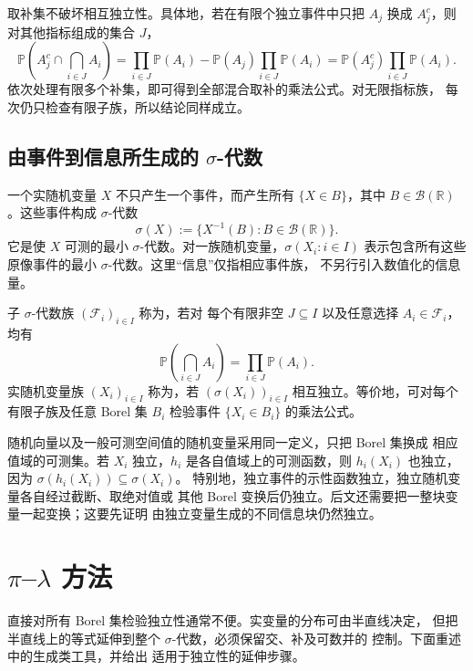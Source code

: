 取补集不破坏相互独立性。具体地，若在有限个独立事件中只把 $A_j$ 换成
$A_j^c$，则对其他指标组成的集合 $J$，
\[
 \mathbb P\left(A_j^c\cap\bigcap_{i\in J}A_i\right)
 =\prod_{i\in J}\mathbb P(A_i)
  -\mathbb P(A_j)\prod_{i\in J}\mathbb P(A_i)
 =\mathbb P(A_j^c)\prod_{i\in J}\mathbb P(A_i).
\]
依次处理有限多个补集，即可得到全部混合取补的乘法公式。对无限指标族，
每次仍只检查有限子族，所以结论同样成立。

\subsection{由事件到信息所生成的 $\sigma$-代数}

一个实随机变量 $X$ 不只产生一个事件，而产生所有 $\{X\in B\}$，其中
$B\in\mathcal B(\mathbb R)$。这些事件构成 $\sigma$-代数
\[
 \sigma(X):=\{X^{-1}(B):B\in\mathcal B(\mathbb R)\}.
\]
它是使 $X$ 可测的最小 $\sigma$-代数。对一族随机变量，$\sigma(X_i:i\in I)$
表示包含所有这些原像事件的最小 $\sigma$-代数。这里“信息”仅指相应事件族，
不另行引入数值化的信息量。

\begin{definition}
\label{def:independent-sigma-fields}
子 $\sigma$-代数族 $(\mathcal F_i)_{i\in I}$ 称为，若对
每个有限非空 $J\subseteq I$ 以及任意选择 $A_i\in\mathcal F_i$，均有
\[
 \mathbb P\left(\bigcap_{i\in J}A_i\right)
 =\prod_{i\in J}\mathbb P(A_i).
\]
实随机变量族 $(X_i)_{i\in I}$ 称为，若
$(\sigma(X_i))_{i\in I}$ 相互独立。等价地，可对每个有限子族及任意
Borel 集 $B_i$ 检验事件 $\{X_i\in B_i\}$ 的乘法公式。
\end{definition}

随机向量以及一般可测空间值的随机变量采用同一定义，只把 Borel 集换成
相应值域的可测集。若 $X_i$ 独立，$h_i$ 是各自值域上的可测函数，则
$h_i(X_i)$ 也独立，因为 $\sigma(h_i(X_i))\subseteq\sigma(X_i)$。
特别地，独立事件的示性函数独立，独立随机变量各自经过截断、取绝对值或
其他 Borel 变换后仍独立。后文还需要把一整块变量一起变换；这要先证明
由独立变量生成的不同信息块仍然独立。

\section{\texorpdfstring{$\pi$--$\lambda$}{pi--lambda} 方法}
\label{sec:independence-pi-lambda}

直接对所有 Borel 集检验独立性通常不便。实变量的分布可由半直线决定，
但把半直线上的等式延伸到整个 $\sigma$-代数，必须保留交、补及可数并的
控制。下面重述中的生成类工具，并给出
适用于独立性的延伸步骤。

